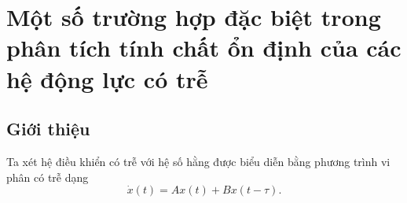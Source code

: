 \chapter{Một số trường hợp đặc biệt trong phân tích tính chất ổn định của các hệ động lực có trễ}
\setlength{\parindent}{6.5ex}

\section{Giới thiệu}
Ta xét hệ điều khiển có trễ với hệ số hằng được biểu diễn bằng phương trình vi phân có trễ dạng
\begin{equation}\label{eq1}
	\dot{x}(t)=Ax(t) + Bx(t -\tau). 
\end{equation}
